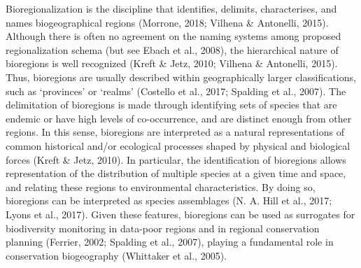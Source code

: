 \documentclass{article}
\begin{document}
Bioregionalization is the discipline that identifies, delimits,
characterises, and names biogeographical regions (Morrone, 2018; Vilhena
\& Antonelli, 2015). Although there is often no agreement on the naming
systems among proposed regionalization schema (but see Ebach et al.,
2008), the hierarchical nature of bioregions is well recognized (Kreft
\& Jetz, 2010; Vilhena \& Antonelli, 2015). Thus, bioregions are usually
described within geographically larger classifications, such as
`provinces' or `realms' (Costello et al., 2017; Spalding et al., 2007).
The delimitation of bioregions is made through identifying sets of
species that are endemic or have high levels of co-occurrence, and are
distinct enough from other regions. In this sense, bioregions are
interpreted as a natural representations of common historical and/or
ecological processes shaped by physical and biological forces (Kreft \&
Jetz, 2010). In particular, the identification of bioregions allows
representation of the distribution of multiple species at a given time
and space, and relating these regions to environmental characteristics.
By doing so, bioregions can be interpreted as species assemblages (N. A.
Hill et al., 2017; Lyons et al., 2017). Given these features, bioregions
can be used as surrogates for biodiversity monitoring in data-poor
regions and in regional conservation planning (Ferrier, 2002; Spalding
et al., 2007), playing a fundamental role in conservation biogeography
(Whittaker et al., 2005).
\end{document}
